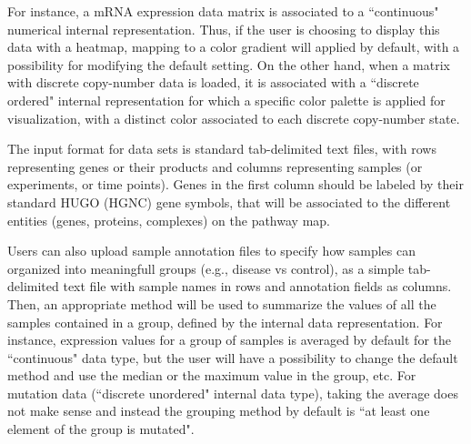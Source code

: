 \documentclass[a4,center,fleqn]{NAR}
\begin{document}
For instance, a mRNA expression data matrix is associated to a
``continuous" numerical internal representation. Thus, if the user is choosing to display
this data with a heatmap, mapping to a color gradient will applied by default, with a possibility
for modifying the default setting. On the other hand, when a
matrix with discrete copy-number data is loaded, it is associated with a
``discrete ordered" internal representation for which
a specific color palette is applied for visualization,
with a distinct color associated to each discrete copy-number state.

The input format for data sets is standard tab-delimited text files, with rows
representing genes or their products and columns representing samples (or experiments, or time
points). Genes in the first column should be labeled by their standard HUGO (HGNC)
gene symbols, that will be associated to the different entities (genes,
proteins, complexes) on the pathway map.

Users can also upload sample annotation files to specify how samples can organized into meaningfull groups
(e.g., disease vs control), as a simple tab-delimited text file with sample names in
rows and annotation fields as columns. Then, an appropriate method will be used
to summarize the values of all the samples contained in a group, defined by the
internal data representation. For instance, expression values for a group of samples
is averaged by default for the ``continuous" data type, but the user will have
a possibility to change the default method and use the median or
the maximum value in the group, etc. For mutation data (``discrete unordered" internal data type),
taking the average does not make sense and instead the grouping method by default is
``at least one element of the group is mutated".

\begin{table}
{
}
\end{table}
\end{document}
